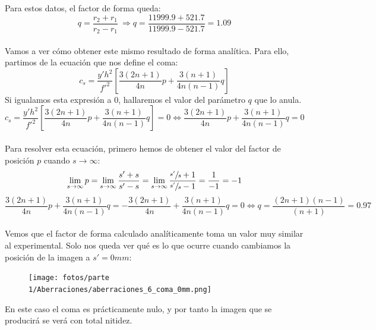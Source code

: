 \documentclass[11pt]{article}
\begin{document}
        Para estos datos, el factor de forma queda:
        \begin{equation*}
            q = \frac{r_2 + r_1}{r_2 - r_1}\ \Longrightarrow q = \frac{11999.9 + 521.7}{11999.9 - 521.7} = 1.09
        \end{equation*}
        \\
        \noindent Vamos a ver cómo obtener este mismo resultado de forma analítica. Para ello, partimos de la ecuación que nos define el coma:
        \begin{equation}
            c_s = \frac{y'h^2}{f'^2}\left[\frac{3(2n+1)}{4n}p + \frac{3(n+1)}{4n(n-1)}q\right]
        \end{equation}
        \noindent
        Si igualamos esta expresión a 0, hallaremos el valor del parámetro $q$ que lo anula.
        \begin{equation*}
            c_s = \frac{y'h^2}{f'^2}\left[\frac{3(2n+1)}{4n}p + \frac{3(n+1)}{4n(n-1)}q\right]= 0\Longleftrightarrow \frac{3(2n+1)}{4n}p + \frac{3(n+1)}{4n(n-1)}q = 0
        \end{equation*}
        \\
        \noindent Para resolver esta ecuación, primero hemos de obtener el valor del factor de posición $p$ cuando $s \rightarrow \infty$:
        \begin{equation*}
            \lim_{s \to \infty}p=\lim_{s \to \infty}\frac{s' + s}{s'-s}= \lim_{s \to \infty}\frac{\sfrac{s'}{s} + 1}{\sfrac{s'}{s}-1} = \frac{1}{-1} = -1
        \end{equation*}
        \begin{equation*}
            \frac{3(2n+1)}{4n}p + \frac{3(n+1)}{4n(n-1)}q = -\frac{3(2n+1)}{4n} + \frac{3(n+1)}{4n(n-1)}q = 0 \Longleftrightarrow q = \frac{(2n+1)(n-1)}{(n+1)} = 0.97
        \end{equation*}
        \\
        \noindent Vemos que el factor de forma calculado analíticamente toma un valor muy similar al experimental. Solo nos queda ver qué es lo que ocurre cuando cambiamos la posición de la imagen a $s' = 0mm$:
        
        \begin{figure}[ht]
            \centering
            \texttt{[image: fotos/parte 1/Aberraciones/aberraciones\_6\_coma\_0mm.png]}
            \label{fig:aberraciones_6_coma_0mm}
        \end{figure}

        \noindent En este caso el coma es prácticamente nulo, y por tanto la imagen que se producirá se verá con total nitidez.
    
\end{document}

